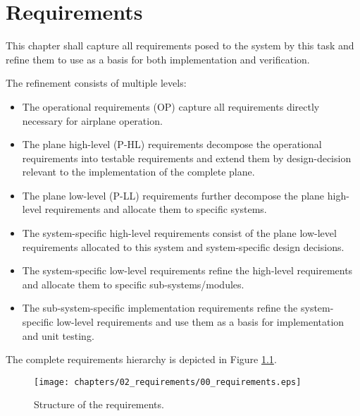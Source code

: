 \chapter{Requirements}
This chapter shall capture all requirements posed to the
system by this task and refine them to use as a basis for
both implementation and verification.

The refinement consists of multiple levels:
\begin{itemize}
    \item The operational requirements (OP) capture all requirements directly necessary for airplane operation.
    \item The plane high-level (P-HL) requirements decompose the operational requirements into testable requirements
        and extend them by design-decision relevant to the implementation of the complete plane.
    \item The plane low-level (P-LL) requirements further decompose the plane high-level requirements and allocate them to
        specific systems.
    \item The system-specific high-level requirements consist of the plane low-level requirements allocated to this system
        and system-specific design decisions.
    \item The system-specific low-level requirements refine the high-level requirements and allocate them to specific
        sub-systems/modules.
    \item The sub-system-specific implementation requirements refine the system-specific low-level requirements and
        use them as a basis for implementation and unit testing.
\end{itemize}
The complete requirements hierarchy is depicted
in Figure \ref{fig:reqStructure}.

\begin{figure}[H]
    \centering
    \texttt{[image: chapters/02\_requirements/00\_requirements.eps]}
    \caption{Structure of the requirements.} 
    \label{fig:reqStructure}
\end{figure}

\newpage





